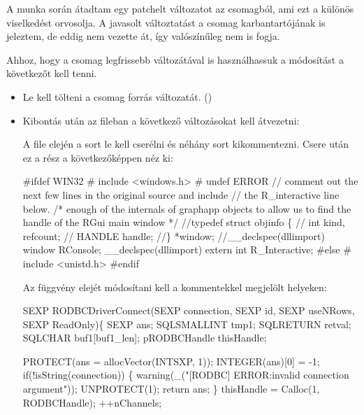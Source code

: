 A munka során átadtam egy patchelt változatot az 
csomagból, ami ezt a különös viselkedést orvosolja. A javasolt
változtatást a csomag karbantartójának is jeleztem, de eddig nem
vezette át, így valószínűleg nem is fogja. 

Ahhoz, hogy a csomag legfrissebb változátával is használhassuk a
módosítást a következőt kell tenni. 
\begin{itemize}
\item Le kell tölteni a csomag forrás változatát. ()
\item Kibontás után az  fileban a következő
  változásokat kell átvezetni:

A file elején a  sort
le kell cserélni és néhány sort kikommentezni.
 Csere után ez a rész a következőképpen néz ki:
\begin{VBAframe}
#ifdef WIN32
# include <windows.h>
# undef ERROR
// comment out the next few lines in the original source and include 
// the R_interactive line below.  
/* enough of the internals of graphapp objects to allow us to find the
   handle of the RGui main window */
//typedef struct objinfo \{
//	int	kind, refcount;
//	HANDLE	handle;
//\} *window;
//__declspec(dllimport) window RConsole;
{\color{DarkRed}__declspec(dllimport) extern int R_Interactive;}
#else
# include <unistd.h>
#endif
\end{VBAframe}

Az  függvény elejét módosítani kell a kommentekkel
megjelölt helyeken:
\begin{VBAframe}
SEXP RODBCDriverConnect(SEXP connection, SEXP id, 
                        SEXP useNRows, SEXP ReadOnly)\{
    SEXP ans;
    SQLSMALLINT tmp1;
    SQLRETURN retval;
    SQLCHAR buf1[buf1_len];
    pRODBCHandle thisHandle;

    PROTECT(ans = allocVector(INTSXP, 1));
    INTEGER(ans)[0] = -1;
    if(!isString(connection)) \{
       warning(_("[RODBC] ERROR:invalid connection argument"));
       UNPROTECT(1);
       return ans;
    \}
    thisHandle = Calloc(1, RODBCHandle);
    ++nChannels;


\end{VBAframe}
\end{itemize}

